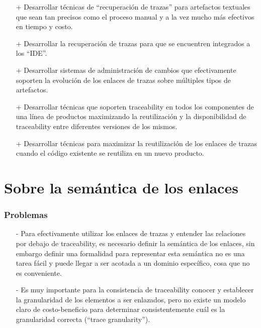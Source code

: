 \documentclass[a4paper,12pt,oneside]{book}
\begin{document}
\begin{itemize}

\item[+]     Desarrollar técnicas de “recuperación de trazas” para artefactos textuales que sean tan precisos como el proceso manual y a la vez mucho más efectivos en tiempo y costo.

\item[+]    Desarrollar la recuperación de trazas para que se encuentren integrados a los ``IDE''.

\item[+]    Desarrollar sistemas de administración de cambios que efectivamente soporten la evolución de los enlaces de trazas sobre múltiples tipos de artefactos.

\item[+]    Desarrollar técnicas que soporten traceability en todos los componentes de una línea de productos maximizando la reutilización y la disponibilidad de traceability entre diferentes versiones de los mismos.

\item[+]    Desarrollar técnicas para maximizar la reutilización de los enlaces de trazas cuando el código existente se reutiliza en un nuevo producto.

\end{itemize}

\section{Sobre la semántica de los enlaces}

\subsubsection{Problemas}

\begin{itemize}

\item[-]     Para efectivamente utilizar los enlaces de trazas y entender las relaciones por debajo de traceability, es necesario definir la semántica de los enlaces, sin embargo definir una formalidad para representar esta semántica no es una tarea fácil y puede llegar a ser acotada a un dominio específico, cosa que no es conveniente.

\item[-]    Es muy importante para la consistencia de traceability conocer y establecer la granularidad de los elementos a ser enlazados, pero no existe un modelo claro de costo-beneficio para determinar consistentemente cuál es la granularidad correcta (“trace granularity”).

\end{itemize}
\end{document}
